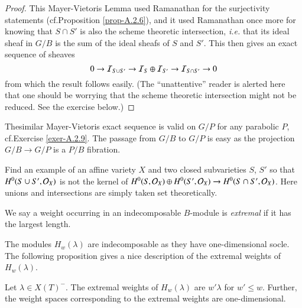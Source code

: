 \begin{proof}
This Mayer-Vietoris Lemma used Ramanathan
\cite{key31} for the 
surjectivity statements (cf.\@ Proposition \ref{prop-A.2.6}), and it used
Ramanathan once more for knowing that $S\cap S'$ is also the scheme
theoretic intersection, {\em i.e.} that its ideal 
sheaf in $G/B$ is
the sum of the ideal sheafs of $S$ and $S'$. This then gives an exact
sequence of sheaves
$$
0\to \mathcal{I}_{S\cup S'}\to \mathcal{I}_{S}\oplus \mathcal{I}_{S'}\to \mathcal{I}_{S\cap S'}\to 0
$$
from which the result follows easily. (The ``unattentive'' reader is
alerted here that one should be worrying that the scheme theoretic
intersection might not be reduced. See the exercise below.)
\end{proof}

\begin{remark}\label{chap2-rem2.2.12}
The\pageoriginale similar\label{page17} Mayer-Vietoris exact sequence is valid on
$G/P$ for any parabolic $P$, cf.\@ Exercise \ref{exer-A.2.9}. The passage from
$G/B$ to $G/P$ is easy as the projection $G/B\to G/P$ is a $P/B$ fibration.
\end{remark}

\begin{exercise}\label{chap2-exer2.2.13}
Find an example of an affine variety $X$ and two closed subvarieties
$S$, $S'$ so that $H^{0}(S\cup S',\mathcal{O}_{X})$ is not the kernel of
$H^{0}(S,\mathcal{O}_{X})\oplus H^{0}(S',\mathcal{O}_{X})\to H^{0}(S\cap
S',\mathcal{O}_{X})$. Here unions and intersections are simply taken set
theoretically. 
\end{exercise}

\begin{definition}\label{chap2-defi2.2.14}
We say a weight occurring in an indecomposable $B$-module is {\em
  extremal} if it has the largest length.
\end{definition}

The modules $H_{w}(\lambda)$ are indecomposable as they have
one-dimensio\-nal socle. The following proposition gives a nice
description of the extremal weights of $H_{w}(\lambda)$.

\begin{proposition}\label{chap2-prop2.2.15}
Let $\lambda\in X(T)^{-}$. The extremal weights of $H_{w}(\lambda)$
are $w'\lambda$ for $w'\leq w$. Further, the weight spaces
corresponding to the extremal weights are one-dimensional.
\end{proposition}

